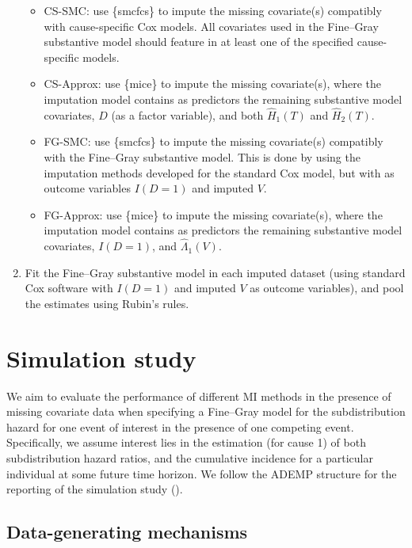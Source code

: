 \documentclass[
  letterpaper,
  DIV=11,
  numbers=noendperiod]{scrreprt}
\providecommand{\tightlist}{%
  \setlength{\itemsep}{0pt}\setlength{\parskip}{0pt}}\usepackage{longtable,booktabs,array}
\begin{document}
\begin{enumerate}
  \begin{itemize}
  \tightlist
  \item
    CS-SMC: use \{smcfcs\} to impute the missing covariate(s) compatibly
    with cause-specific Cox models. All covariates used in the
    Fine--Gray substantive model should feature in at least one of the
    specified cause-specific models.
  \item
    CS-Approx: use \{mice\} to impute the missing covariate(s), where
    the imputation model contains as predictors the remaining
    substantive model covariates, \(D\) (as a factor variable), and both
    \(\hat{H}_1(T)\) and \(\hat{H}_2(T)\).
  \item
    FG-SMC: use \{smcfcs\} to impute the missing covariate(s) compatibly
    with the Fine--Gray substantive model. This is done by using the
    imputation methods developed for the standard Cox model, but with as
    outcome variables \(I(D = 1)\) and imputed \(V\).
  \item
    FG-Approx: use \{mice\} to impute the missing covariate(s), where
    the imputation model contains as predictors the remaining
    substantive model covariates, \(I(D = 1)\), and
    \(\hat{\Lambda}_1(V)\).
  \end{itemize}
\item
  Fit the Fine--Gray substantive model in each imputed dataset (using
  standard Cox software with \(I(D = 1)\) and imputed \(V\) as outcome
  variables), and pool the estimates using Rubin's rules.
\end{enumerate}

\section{Simulation study}\label{sec-sim-study}

We aim to evaluate the performance of different MI methods in the
presence of missing covariate data when specifying a Fine--Gray model
for the subdistribution hazard for one event of interest in the presence
of one competing event. Specifically, we assume interest lies in the
estimation (for cause 1) of both subdistribution hazard ratios, and the
cumulative incidence for a particular individual at some future time
horizon. We follow the ADEMP structure for the reporting of the
simulation study ().

\subsection{Data-generating
mechanisms}\label{data-generating-mechanisms-1}
\end{document}
